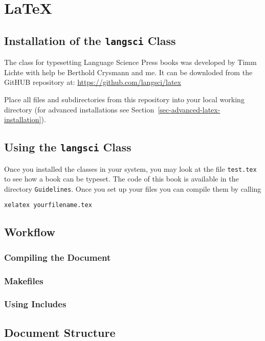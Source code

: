 \chapter{\LaTeX}

\section{Installation of the \texttt{langsci} Class}

The \latex class for typesetting Language Science Press books was developed by Timm Lichte with
help be Berthold Crysmann and me. It can be downloded from the GitHUB repository at: \url{https://github.com/langsci/latex}

Place all files and subdirectories from this repository into your local working directory (for
advanced installations see Section~\ref{sec-advanced-latex-installation}).

\section{Using the \texttt{langsci} Class}

Once you installed the classes in your system, you may look at the file \texttt{test.tex} to see how
a book can be typeset. The code of this book is available in the directory \texttt{Guidelines}. Once
you set up your \latex files you can compile them by calling 
\begin{verbatim}
xelatex yourfilename.tex
\end{verbatim}


\section{Workflow}

\subsection{Compiling the Document}

\subsection{Makefiles}

\subsection{Using Includes}


\section{Document Structure}


